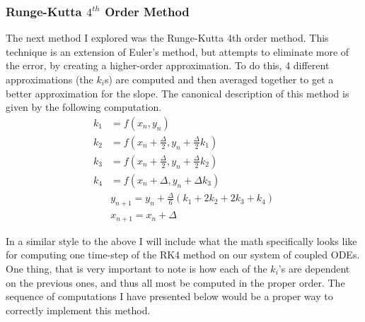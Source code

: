 \documentclass{article}
\begin{document}
\subsubsection{Runge-Kutta $4^{th}$ Order Method}
The next method I explored was the Runge-Kutta 4th order method. This technique is an extension of Euler's method, but attempts to eliminate more of the error, by creating a higher-order approximation. To do this, 4 different approximations (the $k_{i}$s) are computed and then averaged together to get a better approximation for the slope. The canonical description of this method is given by the following computation.
\begin{align*}
k_1 &= f(x_n,y_n)\\
k_2 &= f(x_n+\frac{\Delta}{2},y_n+\frac{\Delta}{2} k_{1})\\
k_3 &= f(x_n+\frac{\Delta}{2},y_n+\frac{\Delta}{2} k_{2})\\
k_4 &= f(x_n+\Delta,y_n+\Delta k_3)\\
&\boxed{y_{n+1}=y_{n}+\frac{\Delta}{6} (k_1+2k_2+2k_3+k_4)}\\
&x_{n+1} = x_n + \Delta
\end{align*}
\par In a similar style to the above I will include what the math specifically looks like for computing one time-step of the RK4 method on our system of coupled ODEs. One thing, that is very important to note is how each of the $k_{i}$'s are dependent on the previous ones, and thus all most be computed in the proper order. The sequence of computations I have presented below would be a proper way to correctly implement this method.
\end{document}

